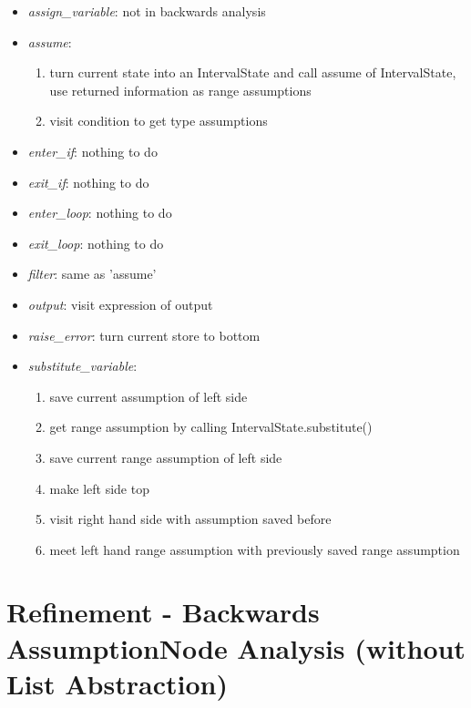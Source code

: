 \documentclass[11pt]{article}
\begin{document}
\begin{itemize}
\item \textit{assign\_variable}: not in backwards analysis
\item \textit{assume}:
\begin{enumerate}
\item turn current state into an IntervalState and call assume of IntervalState, use returned information as range assumptions
\item visit condition to get type assumptions
\end{enumerate} 
\item \textit{enter\_if}: nothing to do
\item \textit{exit\_if}: nothing to do
\item \textit{enter\_loop}: nothing to do
\item \textit{exit\_loop}: nothing to do
\item \textit{filter}: same as 'assume'
\item \textit{output}: visit expression of output
\item \textit{raise\_error}: turn current store to bottom
\item \textit{substitute\_variable}:
\begin{enumerate}
\item save current assumption of left side
\item get range assumption by calling IntervalState.substitute()
\item save current range assumption of left side
\item make left side top
\item visit right hand side with assumption saved before
\item meet left hand range assumption with previously saved range assumption
\end{enumerate}
\end{itemize}


\section{Refinement - Backwards AssumptionNode Analysis (without List Abstraction)}
\end{document}
